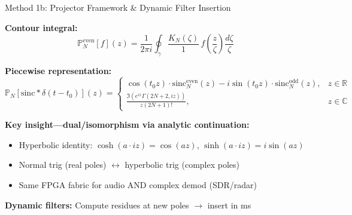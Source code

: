 \documentclass[aspectratio=169,11pt]{beamer}
\begin{document}
\begin{frame}{Method 1b: Projector Framework \& Dynamic Filter Insertion}

\textbf{Contour integral:}
\[
\mathbb{P}_N^{\text{even}}[f](z) = \frac{1}{2\pi i}\oint_{\gamma} \frac{K_N(\zeta)}{1} \, f\!\left(\frac{z}{\zeta}\right) \frac{d\zeta}{\zeta}
\]

\textbf{Piecewise representation:}
\[
\mathbb{P}_N[\text{sinc} * \delta(t-t_0)](z) = \begin{cases}
\cos(t_0 z) \cdot \text{sinc}_N^{\text{even}}(z) - i\sin(t_0 z) \cdot \text{sinc}_N^{\text{odd}}(z), & z \in \mathbb{R}\\[0.3em]
\frac{\Im(e^{iz}\Gamma(2N+2,iz))}{z(2N+1)!}, & z \in \mathbb{C}
\end{cases}
\]

\vspace{0.2cm}

\textbf{Key insight—dual/isomorphism via analytic continuation:}
\begin{itemize}
    \item Hyperbolic identity: $\cosh(a \cdot iz) = \cos(az)$, $\sinh(a \cdot iz) = i\sin(az)$
    \item Normal trig (real poles) $\leftrightarrow$ hyperbolic trig (complex poles)
    \item Same FPGA fabric for audio AND complex demod (SDR/radar)
\end{itemize}

\vspace{0.15cm}

\textbf{Dynamic filters:} Compute residues at new poles $\rightarrow$ insert in ms

\end{frame}
\end{document}
